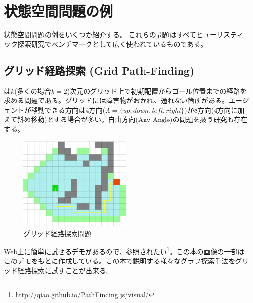 \section{状態空間問題の例}
\label{sec:search-problem}

状態空間問題の例をいくつか紹介する。
これらの問題はすべてヒューリスティック探索研究でベンチマークとして広く使われているものである。



\subsection{グリッド経路探索 (Grid Path-Finding)}


は$k$(多くの場合$k=2$)次元のグリッド上で初期配置からゴール位置までの経路を求める問題である\cite{yap2002grid}。グリッドには障害物がおかれ、通れない箇所がある。エージェントが移動できる方向は4方向($A= \{up, down, left, right\}$)か8方向(4方向に加えて斜め移動)とする場合が多い。自由方向(Any Angle)の問題を扱う研究も存在する\cite{nash2007theta}。

\begin{figure}
        \centering
	\includegraphics[width=0.5\textwidth]{figures/grid-astar.png}
	\caption{グリッド経路探索問題}
	\label{fig:grid-pathfinding}
\end{figure}


Web上に簡単に試せるデモがあるので、参照されたい\footnote{\url{http://qiao.github.io/PathFinding.js/visual/}}。この本の画像の一部はこのデモをもとに作成している。この本で説明する様々なグラフ探索手法をグリッド経路探索に試すことが出来る。

